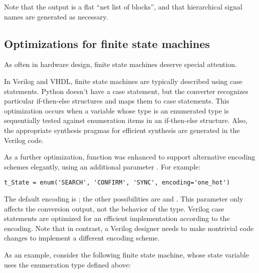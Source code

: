Note that the output is a flat ``net list of blocks'', and
that hierarchical signal names are generated as necessary.

\subsection{Optimizations for finite state machines\label{conv-usage-fsm}}
As often in hardware design, finite state machines deserve special attention.

In Verilog and VHDL, finite state machines are typically described
using case statements.  Python doesn't have a case statement, but the
converter recognizes particular if-then-else structures and maps them
to case statements. This optimization occurs when a variable whose
type is an enumerated type is sequentially tested against enumeration
items in an if-then-else structure. Also, the appropriate synthesis
pragmas for efficient synthesis are generated in the Verilog code.

As a further optimization, function  was enhanced to support
alternative encoding schemes elegantly, using an additional parameter
. For example:

\begin{verbatim}
t_State = enum('SEARCH', 'CONFIRM', 'SYNC', encoding='one_hot')
\end{verbatim}

The default encoding is ; the other possibilities are
 and . This parameter only
affects the conversion output, not the behavior of the type. Verilog
case statements are optimized for an efficient implementation
according to the encoding. Note that in contrast, a Verilog designer
needs to make nontrivial code changes to implement a different
encoding scheme.

As an example, consider the following finite state machine, whose
state variable uses the enumeration type defined above:

